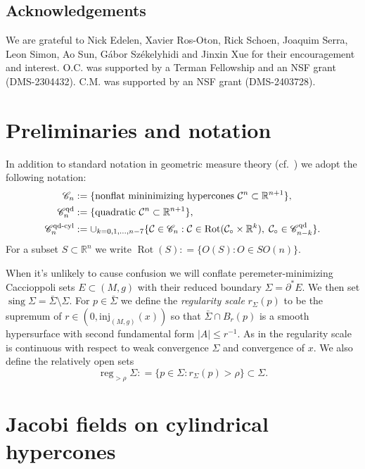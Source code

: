 \documentclass[11pt, letterpaper, reqno]{amsart}
\numberwithin{equation}{section}
\theoremstyle{remark}
\newcommand{\RR}{\mathbb{R}}
\newcommand{\cC}{\mathcal{C}}
\newcommand{\reg}{\operatorname{reg}}
\newcommand{\sing}{\operatorname{sing}}
\newcommand{\Rot}{\operatorname{Rot}}
\begin{document}
\subsection{Acknowledgements}
We are grateful to Nick Edelen, Xavier Ros-Oton, Rick Schoen, Joaquim Serra, Leon Simon, Ao Sun, G\'abor Sz\'ekelyhidi and Jinxin Xue for their encouragement and interest. O.C. was supported by a Terman Fellowship and an NSF grant
(DMS-2304432). C.M. was supported by an NSF grant (DMS-2403728).


\section{Preliminaries and notation}

In addition to standard notation in geometric measure theory (cf.\ \cite{Simon:GMT}) we adopt the following notation:
\begin{align}
	\mathscr{C}_n & := \{ \text{nonflat mininimizing hypercones } \cC^n \subset \RR^{n+1} \}, \label{eq:mathscr.n} \\
	\mathscr{C}_n^{\textnormal{qd}} & := \{ \text{quadratic } \cC^n \subset \RR^{n+1} \}, \label{eq:mathscr.n.qd} \\
        \mathscr{C}_n^{\textnormal{qd-cyl}} & := \cup_{k=0,1,\ldots,n-7} \{ \cC \in \mathscr{C}_n : \cC \in \Rot(\cC_\circ \times \RR^k), \; \cC_\circ \in \mathscr{C}_{n-k}^{\textnormal{qd}} \}. \label{eq:mathscr.n.qd-cyl}
\end{align}
For a subset $S\subset \RR^n$ we write $\Rot(S) : = \{O(S) : O \in SO(n)\}$. 

When it's unlikely to cause confusion we will conflate peremeter-minimizing Caccioppoli sets $E \subset (M,g)$ with their reduced boundary $\Sigma = \partial^*E$. We then set $\sing \Sigma = \bar\Sigma\setminus \Sigma$. For $p \in \bar \Sigma$ we define the \emph{regularity scale} $r_\Sigma(p)$ to be the supremum of $r \in (0,\textrm{inj}_{(M,g)}(x))$ so that $\bar\Sigma \cap B_r(p)$ is a smooth hypersurface with second fundamental form $|A|\leq r^{-1}$. As in \cite[Lemma 2.4]{CMS:generic.9.10} the regularity scale is continuous with respect to weak convergence $\Sigma$ and convergence of $x$. We also define the relatively open sets
\[
\reg_{>\rho}\Sigma : = \{p \in \Sigma : r_\Sigma(p) > \rho\} \subset \Sigma. 
\]


\section{Jacobi fields on cylindrical hypercones}
\end{document}
